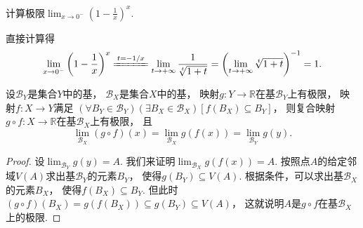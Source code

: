 \begin{example}
计算极限\(\lim_{x\to0^-} \left(1-\frac1x\right)^x\).
\begin{solution}
直接计算得\begin{equation*}
	\lim_{x\to0^-} \left(1-\frac1x\right)^x
	\xlongequal{t=-1/x} \lim_{t\to+\infty} \frac{1}{\sqrt[t]{1+t}}
	= \left(\lim_{t\to+\infty} \sqrt[t]{1+t}\right)^{-1}
	= 1.
\end{equation*}
\end{solution}
\end{example}

\begin{theorem}
设\(\mathcal{B}_Y\)是集合\(Y\)中的基，
\(\mathcal{B}_X\)是集合\(X\)中的基，
映射\(g\colon Y\to\mathbb{R}\)在基\(\mathcal{B}_Y\)上有极限，
映射\(f\colon X\to Y\)满足
\((\forall B_Y\in\mathcal{B}_Y)
(\exists B_X\in\mathcal{B}_X)
[f(B_X) \subseteq B_Y]\)，
则复合映射\(g \circ f\colon X\to\mathbb{R}\)在基\(\mathcal{B}_X\)上有极限，
且\begin{equation*}
	\lim_{\mathcal{B}_X} (g \circ f)(x)
	= \lim_{\mathcal{B}_X} g(f(x))
	= \lim_{\mathcal{B}_Y} g(y).
\end{equation*}
\begin{proof}
设\(\lim_{\mathcal{B}_Y} g(y) = A\).
我们来证明\(\lim_{\mathcal{B}_X} g(f(x)) = A\).
按照点\(A\)的给定邻域\(V(A)\)求出基\(\mathcal{B}_Y\)的元素\(B_Y\)，
使得\(g(B_Y) \subseteq V(A)\).
根据条件，可以求出基\(\mathcal{B}_X\)的元素\(B_X\)，
使得\(f(B_X) \subseteq B_Y\).
但此时\((g \circ f)(B_X) = g(f(B_X)) \subseteq g(B_Y) \subseteq V(A)\)，
这就说明\(A\)是\(g \circ f\)在基\(\mathcal{B}_X\)上的极限.
\end{proof}
\end{theorem}

